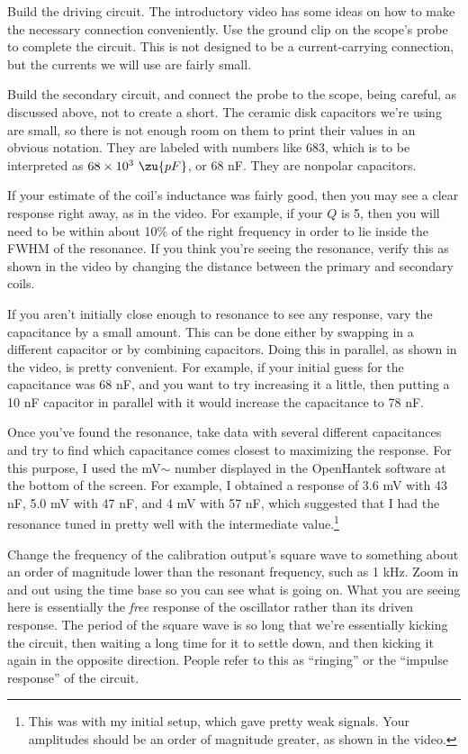 Build the driving circuit. The introductory video has some ideas on how to
make the necessary connection conveniently.
Use the ground clip on the scope's probe to complete the circuit.
This is not designed to be a current-carrying connection, but the
currents we will use are fairly small.

Build the secondary circuit, and connect the probe to the scope,
being careful, as discussed above, not to create a short. The ceramic
disk capacitors we're using are small, so there is not enough room
on them to print their values in an obvious notation. They are labeled
with numbers like 683, which is to be interpreted as $68\times10^3\ \zu{pF}$,
or 68 nF. They are nonpolar capacitors.

If your estimate of the coil's inductance was fairly good, then you
may see a clear response right away, as in the video. For example,
if your $Q$ is 5, then you will need to be within about 10\% of
the right frequency in order to lie inside the FWHM of the resonance.
If you think you're seeing the resonance, verify this as shown
in the video by changing the distance between the primary and
secondary coils.

If you aren't initially close enough to resonance
to see any response, vary the capacitance by a small amount. This
can be done either by swapping in a different capacitor or by
combining capacitors. Doing this in parallel, as shown in the video,
is pretty convenient. For example, if your initial guess for the
capacitance was 68 nF, and you want to try increasing it a little,
then putting a 10 nF capacitor in parallel with it would increase
the capacitance to 78 nF.

Once you've found the resonance, take data with several different
capacitances and try to find which capacitance comes closest to
maximizing the response. For this purpose, I used the mV$\sim$ number
displayed in the OpenHantek software at the bottom of the screen.
For example, I obtained a response of 3.6 mV with 43 nF,
5.0 mV with 47 nF, and 4 mV with 57 nF, which suggested that I
had the resonance tuned in pretty well with the intermediate
value.\footnote{This was with my initial setup, which gave pretty weak
signals. Your amplitudes should be an order of magnitude greater,
as shown in the video.}


Change the frequency of the calibration output's square wave to something about an order
of magnitude lower than the resonant frequency, such as 1 kHz. Zoom in and out using the
time base so you can see what is going on. What you are seeing here is essentially the
\emph{free} response of the oscillator rather than its driven response. The period of the square wave is
so long that we're essentially kicking the circuit, then waiting a long time for it to settle down,
and then kicking it again in the opposite direction. People refer to this as ``ringing''
or the ``impulse response'' of the circuit.

